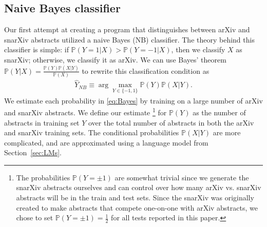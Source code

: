 \documentclass{article}
\renewcommand{\P}{\mathbb{P}}
\begin{document}
\subsection{Naive Bayes classifier}
Our first attempt at creating a program that distinguishes between arXiv and snarXiv abstracts utilized a naive Bayes (NB) classifier.
The theory behind this classifier is simple: if $\P(Y=1|X) > \P(Y=-1|X)$, then we classify $X$ as snarXiv; otherwise, we classify it as arXiv.
We can use Bayes' theorem $\P(Y|X) = \frac{\P(Y)\P(X|Y)}{\P(X)}$ to rewrite this classification condition as
\begin{align}
  \widehat{Y}_{NB} \equiv \arg\max_{Y\in\{-1,1\}} \P(Y)\P(X|Y). \label{eq:Bayes}
\end{align}
We estimate each probability in \eqref{eq:Bayes} by training on a large number of arXiv and snarXiv abstracts.
We define our estimate%
\footnote{The probabilities $\P(Y=\pm1)$ are somewhat trivial since we generate the snarXiv abstracts ourselves and can control over how many arXiv vs. snarXiv abstracts will be in the train and test sets. Since the snarXiv was originally created to make abstracts that compete one-on-one with arXiv abstracts, we chose to set $\P(Y=\pm1)=\tfrac{1}{2}$ for all tests reported in this paper.}
%
for $\P(Y)$ as the number of abstracts in training set $Y$ over the total number of abstracts in both the arXiv and snarXiv training sets.
The conditional probabilities $\P(X|Y)$ are more complicated, and are approximated using a language model from Section~\ref{sec:LMs}.
\end{document}
